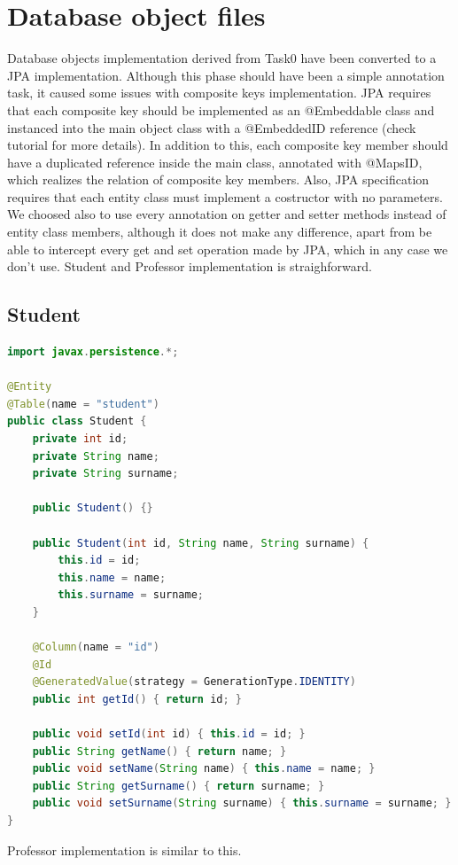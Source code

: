 \documentclass{report}
\begin{document}
\section*{Database object files}
Database objects implementation derived from Task0 have been converted to a JPA implementation. Although this phase should have been a simple annotation task, it caused some issues with composite keys implementation. JPA requires that each composite key should be implemented as an @Embeddable class and instanced into the main object class with a @EmbeddedID reference (check tutorial for more details). In addition to this, each composite key member should have a duplicated reference inside the main class, annotated with @MapsID, which realizes the relation of composite key members. Also, JPA specification requires that each entity class must implement a costructor with no parameters. We choosed also to use every annotation on getter and setter methods instead of entity class members, although it does not make any difference, apart from be able to intercept every get and set operation made by JPA, which in any case we don't use. Student and Professor implementation is straighforward.

\subsection*{Student}
\begin{lstlisting}[language=Java]
import javax.persistence.*;

@Entity
@Table(name = "student")
public class Student {
	private int id;
	private String name;
	private String surname;

	public Student() {}

	public Student(int id, String name, String surname) {
		this.id = id;
		this.name = name;
		this.surname = surname;
	}

	@Column(name = "id")
	@Id
	@GeneratedValue(strategy = GenerationType.IDENTITY)
	public int getId() { return id; }

	public void setId(int id) { this.id = id; }
	public String getName() { return name; }
	public void setName(String name) { this.name = name; }
	public String getSurname() { return surname; }
	public void setSurname(String surname) { this.surname = surname; }
}
\end{lstlisting}
Professor implementation is similar to this.
\end{document}
